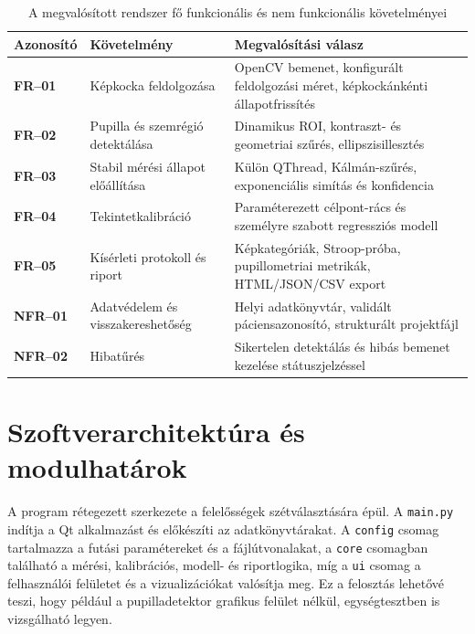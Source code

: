 \documentclass[12pt,a4paper,oneside]{book}
\begin{document}
\begin{table}[H]
    \centering
    \renewcommand{\arraystretch}{1.5}
    \caption{A megvalósított rendszer fő funkcionális és nem funkcionális követelményei}
    \label{tab:system_requirements}
    \begin{tabular}{@{} l p{5.3cm} p{5.3cm} @{}}
        \toprule
        \textbf{Azonosító} & \textbf{Követelmény} & \textbf{Megvalósítási válasz} \\
        \midrule
        \textbf{FR--01} & Képkocka feldolgozása & OpenCV bemenet, konfigurált feldolgozási méret, képkockánkénti állapotfrissítés \\
        \textbf{FR--02} & Pupilla és szemrégió detektálása & Dinamikus ROI, kontraszt- és geometriai szűrés, ellipszisillesztés \\
        \textbf{FR--03} & Stabil mérési állapot előállítása & Külön QThread, Kálmán-szűrés, exponenciális simítás és konfidencia \\
        \textbf{FR--04} & Tekintetkalibráció & Paraméterezett célpont-rács és személyre szabott regressziós modell \\
        \textbf{FR--05} & Kísérleti protokoll és riport & Képkategóriák, Stroop-próba, pupillometriai metrikák, HTML/JSON/CSV export \\
        \textbf{NFR--01} & Adatvédelem és visszakereshetőség & Helyi adatkönyvtár, validált páciensazonosító, strukturált projektfájl \\
        \textbf{NFR--02} & Hibatűrés & Sikertelen detektálás és hibás bemenet kezelése státuszjelzéssel \\
        \bottomrule
    \end{tabular}
\end{table}

\section{Szoftverarchitektúra és modulhatárok}

A program rétegezett szerkezete a felelősségek szétválasztására épül. A \texttt{main.py} indítja a Qt alkalmazást és előkészíti az adatkönyvtárakat. A \texttt{config} csomag tartalmazza a futási paramétereket és a fájlútvonalakat, a \texttt{core} csomagban található a mérési, kalibrációs, modell- és riportlogika, míg a \texttt{ui} csomag a felhasználói felületet és a vizualizációkat valósítja meg. Ez a felosztás lehetővé teszi, hogy például a pupilladetektor grafikus felület nélkül, egységtesztben is vizsgálható legyen.
\end{document}
